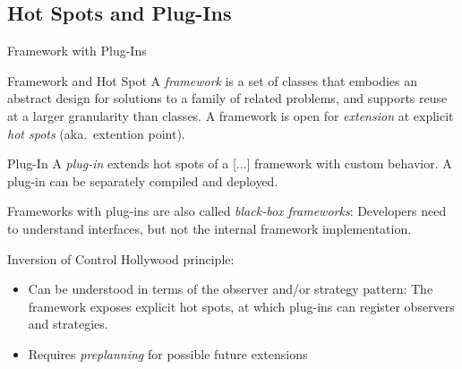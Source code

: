 
\subsection{Hot Spots and Plug-Ins}
\begin{frame}{Framework with Plug-Ins}
	\begin{mycolumns}[b]
		\begin{definition}{Framework and Hot Spot }
			A \emph{framework} is a set of classes that embodies an abstract design for solutions to a family of related problems, and supports reuse at a larger granularity than classes. A framework is open for \emph{extension} at explicit \emph{hot spots} (aka.\ extention point).
		\end{definition}
		\begin{definition}{Plug-In }
			A \emph{plug-in} extends hot spots of a [...] framework with custom behavior. A plug-in can be separately compiled and deployed.	
		\end{definition}
		\begin{note}{}
			Frameworks with plug-ins are also called \emph{black-box frameworks}: Developers need to understand interfaces, but not the internal framework implementation.
		\end{note}
	\mynextcolumn
		\vspace{-12mm}
		\begin{note}{Inversion of Control}
			Hollywood principle: 

			\centering 
		\end{note}
		\begin{note}{}
			\begin{itemize}
				\item Can be understood in terms of the observer and/or strategy pattern: The framework exposes explicit hot spots, at which plug-ins can register observers and strategies.
				\item Requires \emph{preplanning} for possible future extensions
			\end{itemize}
		\end{note}
	\end{mycolumns}
\end{frame}

